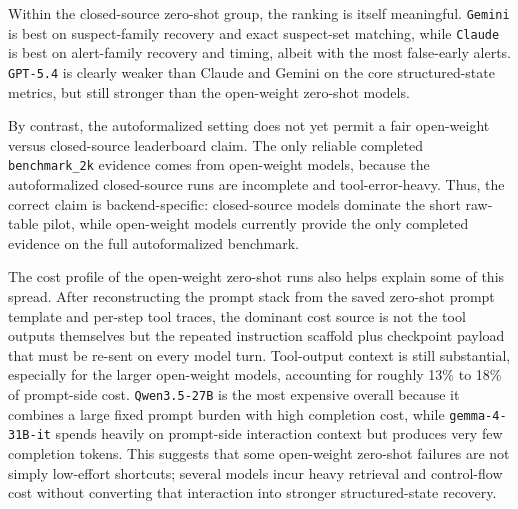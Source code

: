 Within the closed-source zero-shot group, the ranking is itself meaningful. \texttt{Gemini} is best on suspect-family recovery and exact suspect-set matching, while \texttt{Claude} is best on alert-family recovery and timing, albeit with the most false-early alerts. \texttt{GPT-5.4} is clearly weaker than Claude and Gemini on the core structured-state metrics, but still stronger than the open-weight zero-shot models.

By contrast, the autoformalized setting does not yet permit a fair open-weight versus closed-source leaderboard claim. The only reliable completed \texttt{benchmark\_2k} evidence comes from open-weight models, because the autoformalized closed-source runs are incomplete and tool-error-heavy. Thus, the correct claim is backend-specific: closed-source models dominate the short raw-table pilot, while open-weight models currently provide the only completed evidence on the full autoformalized benchmark.

The cost profile of the open-weight zero-shot runs also helps explain some of this spread. After reconstructing the prompt stack from the saved zero-shot prompt template and per-step tool traces, the dominant cost source is not the tool outputs themselves but the repeated instruction scaffold plus checkpoint payload that must be re-sent on every model turn. Tool-output context is still substantial, especially for the larger open-weight models, accounting for roughly 13\% to 18\% of prompt-side cost. \texttt{Qwen3.5-27B} is the most expensive overall because it combines a large fixed prompt burden with high completion cost, while \texttt{gemma-4-31B-it} spends heavily on prompt-side interaction context but produces very few completion tokens. This suggests that some open-weight zero-shot failures are not simply low-effort shortcuts; several models incur heavy retrieval and control-flow cost without converting that interaction into stronger structured-state recovery.

